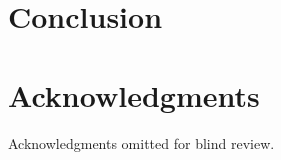 \documentclass{sigchi}
\begin{document}
\section{Conclusion}

\section{Acknowledgments}
Acknowledgments omitted for blind review.

\balance








\end{document}
